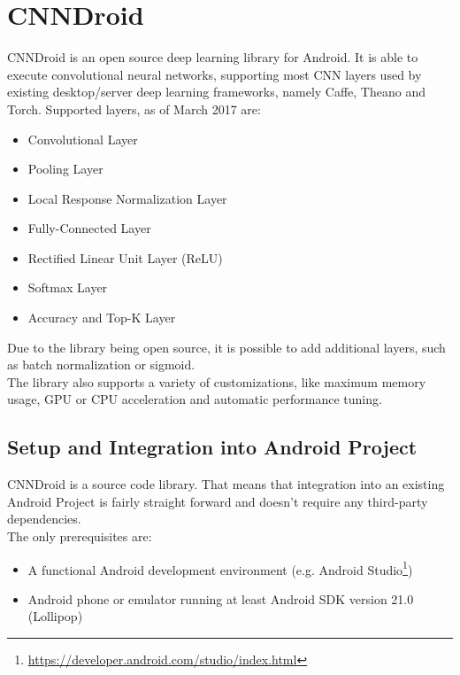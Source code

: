 \section{CNNDroid}
CNNDroid is an open source deep learning library for Android. It is able to execute convolutional neural networks, supporting most CNN layers used by existing desktop/server deep learning frameworks, namely Caffe, Theano and Torch. Supported layers, as of March 2017 are:
\begin{itemize}
    \item{Convolutional Layer}
    \item{Pooling Layer}
    \item{Local Response Normalization Layer}
    \item{Fully-Connected Layer}
    \item{Rectified Linear Unit Layer (ReLU)}
    \item{Softmax Layer}
    \item{Accuracy and Top-K Layer}
\end{itemize}
Due to the library being open source, it is possible to add additional layers, such as batch normalization or sigmoid.\\
The library also supports a variety of customizations, like maximum memory usage, GPU or CPU acceleration and automatic performance tuning.

\subsection{Setup and Integration into Android Project}
CNNDroid is a source code library. That means that integration into an existing Android Project is fairly straight forward and doesn't require any third-party dependencies.\\
The only prerequisites are:
\begin{itemize}
    \item{A functional Android development environment (e.g. Android Studio\footnote{\url{https://developer.android.com/studio/index.html}})}
    \item{Android phone or emulator running at least Android SDK version 21.0 (Lollipop)}
\end{itemize}

